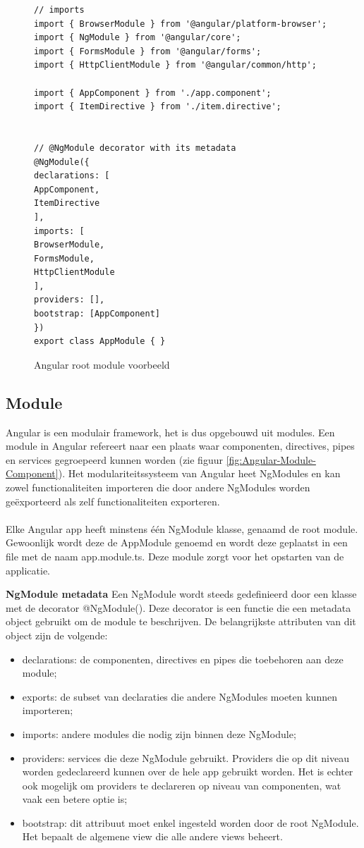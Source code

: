 \begin{figure}
\begin{lstlisting}[]
// imports
import { BrowserModule } from '@angular/platform-browser';
import { NgModule } from '@angular/core';
import { FormsModule } from '@angular/forms';
import { HttpClientModule } from '@angular/common/http';

import { AppComponent } from './app.component';
import { ItemDirective } from './item.directive';


// @NgModule decorator with its metadata
@NgModule({
declarations: [
AppComponent,
ItemDirective
],
imports: [
BrowserModule,
FormsModule,
HttpClientModule
],
providers: [],
bootstrap: [AppComponent]
})
export class AppModule { }
\end{lstlisting}
\caption{Angular root module voorbeeld}
\end{figure}


\subsection{Module}
Angular is een modulair framework, het is dus opgebouwd uit modules. Een module in Angular refereert naar een plaats waar componenten, directives, pipes en services gegroepeerd kunnen worden (zie figuur \ref{fig:Angular-Module-Component}). 
Het modulariteitssysteem van Angular heet NgModules en kan zowel functionaliteiten importeren die door andere NgModules worden geëxporteerd als zelf functionaliteiten exporteren. 
\\ \\
Elke Angular app heeft minstens één NgModule klasse, genaamd de root module. Gewoonlijk wordt deze de AppModule genoemd en wordt deze geplaatst in een file met de naam app.module.ts. Deze module zorgt voor het opstarten van de applicatie. 


\textbf{NgModule metadata} \hspace{1cm} Een NgModule wordt steeds gedefinieerd door een klasse met de decorator @NgModule(). Deze decorator is een functie die een metadata object gebruikt om de module te beschrijven. De belangrijkste attributen van dit object zijn de volgende: 
\begin{itemize}
	\item declarations: de componenten, directives en pipes die toebehoren aan deze module;  
	\item exports: de subset van declaraties die andere NgModules moeten kunnen importeren; 
	\item imports: andere modules die nodig zijn binnen deze NgModule; 
	\item providers: services die deze NgModule gebruikt. Providers die op dit niveau worden gedeclareerd kunnen over de hele app gebruikt worden. Het is echter ook mogelijk om providers te declareren op niveau van componenten, wat vaak een betere optie is;
	\item bootstrap: dit attribuut moet enkel ingesteld worden door de root NgModule. Het bepaalt de algemene view die alle andere views beheert.
\end{itemize}

